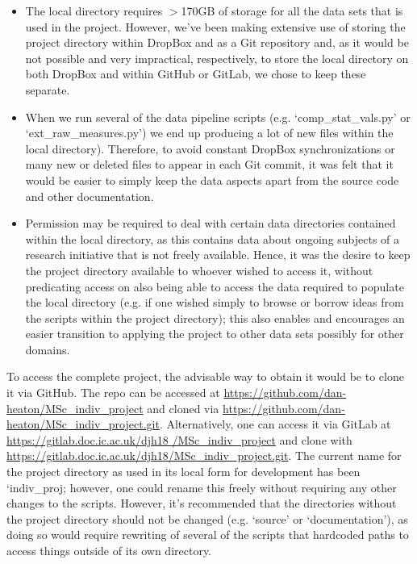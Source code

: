 \documentclass[12pt,twoside]{report}
\begin{document}
\begin{itemize}
	\item The local directory requires $>$170GB of storage for all the data sets that is used in the project. However, we’ve been making extensive use of storing the project directory within DropBox and as a Git repository and, as it would be not possible and very impractical, respectively, to store the local directory on both DropBox and within GitHub or GitLab, we chose to keep these separate.
	\item When we run several of the data pipeline scripts (e.g. ‘comp\_stat\_vals.py’ or ‘ext\_raw\_measures.py’) we end up producing a lot of new files within the local directory). Therefore, to avoid constant DropBox synchronizations or many new or deleted files to appear in each Git commit, it was felt that it would be easier to simply keep the data aspects apart from the source code and other documentation.
	\item Permission may be required to deal with certain data directories contained within the local directory, as this contains data about ongoing subjects of a research initiative that is not freely available. Hence, it was the desire to keep the project directory available to whoever wished to access it, without predicating access on also being able to access the data required to populate the local directory (e.g. if one wished simply to browse or borrow ideas from the scripts within the project directory); this also enables and encourages an easier transition to applying the project to other data sets possibly for other domains.
\end{itemize}

\quad To access the complete project, the advisable way to obtain it would be to clone it via GitHub. The repo can be accessed at \url{https://github.com/dan-heaton/MSc\_indiv\_project} and cloned via \url{https://github.com/dan-heaton/MSc\_indiv\_project.git}. Alternatively, one can access it via GitLab at \url{https://gitlab.doc.ic.ac.uk/djh18 /MSc\_indiv\_project} and clone with \url{https://gitlab.doc.ic.ac.uk/djh18/MSc\_indiv\_project.git}.  The current name for the project directory as used in its local form for development has been ‘indiv\_proj; however, one could rename this freely without requiring any other changes to the scripts. However, it’s recommended that the directories without the project directory should not be changed (e.g. ‘source’ or ‘documentation’), as doing so would require rewriting of several of the scripts that hardcoded paths to access things outside of its own directory.
\end{document}
